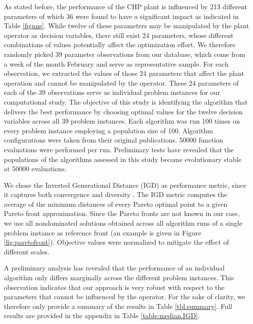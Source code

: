 As stated before, the performance of the CHP plant is influenced by 213 different parameters of which 36 were found to have a significant impact as indicated in Table \ref{fignns}. While twelve of these parameters may be manipulated by the plant operator as decision variables, there still exist 24 parameters, whose different combinations of values potentially affect the optimization effort.
%
We therefore randomly picked 39 parameter observations from our database, which come from a week of the month February and serve as representative sample. For each observation, we extracted the values of those 24 parameters that affect the plant operation and cannot be manipulated by the operator. These 24 parameters of each of the 39 observations serve as individual problem instances for our computational study. 
%
The objective of this study is identifying the algorithm that delivers the best performance by choosing optimal values for the twelve decision variables across all 39 problem instances. Each algorithm was run 100 times on every problem instance employing a population size of 100. Algorithm configurations were taken from their original publications. \num{50000} function evaluations were performed per run. Preliminary tests have revealed that the populations of the algorithms assessed in this study become evolutionary stable at \num{50000} evaluations.

We chose the Inverted Generational Distance (IGD) as performance metric, since it captures both convergence and diversity \cite{van1998evolutionary}. The IGD metric computes the average of the minimum distances of every Pareto optimal point to a given Pareto front approximation. Since the Pareto fronts are not known in our case, we use all nondominated solutions obtained across all algorithm runs of a single problem instance as reference front (an example is given in Figure \ref{fig:paretofront}). Objective values were normalized to mitigate the effect of different scales.

A preliminary analysis has revealed that the performance of an individual algorithm only differs marginally across the different problem instances. This observation indicates that our approach is very robust with respect to the parameters that cannot be influenced by the operator. For the sake of clarity, we therefore only provide a summary of the results in Table \ref{tbl:summary}. Full results are provided in the appendix in Table \ref{table:median.IGD}.


